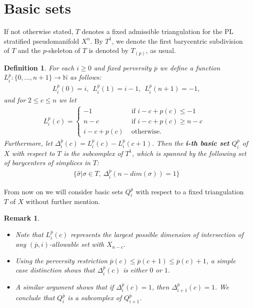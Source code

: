 \documentclass{scrreprt}
\newtheorem{definition}[prop]{Definition}
\newtheorem{remark}[prop]{Remark}
\begin{document}
\section{Basic sets}

If not otherwise stated, $T$ denotes a fixed admissible triangulation for the PL stratified pseudomanifold $X^n$. By $T^1$, we denote the first barycentric subdivision of $T$ and the $p$-skeleton of $T$ is denoted by $T_{(p)}$, as usual.

\begin{definition}
For each $i \geq 0$ and fixed perversity $\overline{p}$ we define a function $L_i^{\overline{p}}: \{ 0,...,n+1 \} \to \mathbb{N}$ as follows: 
\begin{align*}
L_i^{\overline{p}}(0)=i,\ \ L_i^{\overline{p}}(1)=i-1,\ \ L_i^{\overline{p}}(n+1)=-1,
\end{align*}
and for $2 \leq c \leq n$ we let
\begin{align*}
L_i^{\overline{p}}(c)=
\begin{cases}
-1 &\text{ if $i-c+p(c) \leq -1$}  \\
n-c &\text{ if $i-c+p(c) \geq n-c$ } \\
i-c+p(c) &\text{ otherwise.}
\end{cases}
\end{align*}
Furthermore, let $\Delta_i^{\overline{p}}(c)=L_i^{\overline{p}}(c) - L_i^{\overline{p}}(c+1)$. Then the \textbf{i-th basic set} $Q_i^{\overline{p}}$ of $X$ with respect to $T$ is the subcomplex of $T^1$, which is spanned by the following set of barycenters of simplices in $T$:
\begin{align*}
\{ \hat{\sigma} | \sigma \in T,\ \Delta_i^{\overline{p}}(n-dim(\sigma))=1\}
\end{align*}
\end{definition}

From now on we will consider basic sets $Q_i^{\overline{p}}$ with respect to a fixed triangulation $T$ of $X$ without further mention.

\begin{remark}\label{remarkbasic}
\begin{itemize}
\item[1.] Note that $L_i^{\overline{p}}(c)$ represents the largest possible dimension of intersection of any $(\overline{p},i)$-allowable set with $X_{n-c}$.
\item[2.] Using the perversity restriction $\overline{p}(c) \leq \overline{p}(c+1) \leq \overline{p}(c)+1$, a simple case distinction shows that $\Delta_i^{\overline{p}}(c)$ is either $0$ or $1$.
\item[3.] A similar argument shows that if $\Delta_i^{\overline{p}}(c)=1$, then $\Delta_{i+1}^{\overline{p}}(c)=1$. We conclude that $Q_i^{\overline{p}}$ is a subcomplex of $Q_{i+1}^{\overline{p}}$.
\end{itemize}
\end{remark}
\end{document}

